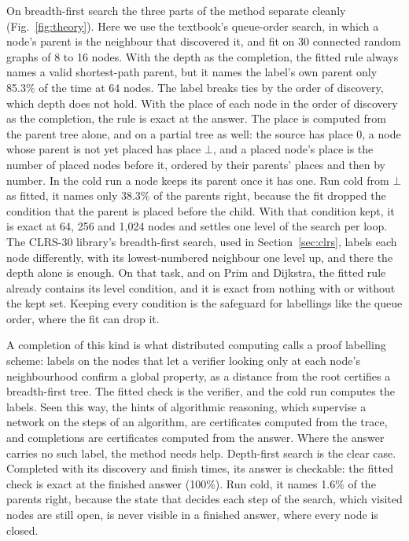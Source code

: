 \documentclass[10pt]{article}
\newcommand{\notyet}{\bot}
\begin{document}
On breadth-first search the three parts of the method separate cleanly (Fig.~\ref{fig:theory}). Here we use the
textbook's queue-order search, in which a node's parent is the neighbour that discovered it, and fit on 30 connected
random graphs of 8 to 16 nodes. With the depth as the completion, the fitted rule always names a valid shortest-path
parent, but it names the label's own parent only 85.3\% of the time at 64 nodes. The label breaks ties by
the order of discovery, which depth does not hold. With the place of each node in the order of discovery as the
completion, the rule is exact at the answer. The place is computed from the parent tree alone, and on a partial tree as
well: the source has place 0, a node whose parent is not yet placed has place $\notyet$, and a placed node's place is the
number of placed nodes before it, ordered by their parents' places and then by number. In the cold run a node keeps its
parent once it has one. Run cold from $\notyet$ as fitted, it
names only 38.3\% of the parents right, because the fit dropped the condition that the parent is placed
before the child. With that condition kept, it is exact at 64, 256 and 1,024 nodes and settles one level of the search
per loop. The CLRS-30 library's breadth-first search, used in Section~\ref{sec:clrs}, labels each node differently, with
its lowest-numbered neighbour one level up, and there the depth alone is enough. On that task, and on Prim and Dijkstra,
the fitted rule already contains its level condition, and it is exact from nothing with or without the kept set. Keeping every condition is the safeguard for labellings
like the queue order, where the fit can drop it.

A completion of this kind is what distributed computing calls a proof labelling scheme: labels on the nodes that let a
verifier looking only at each node's neighbourhood confirm a global property, as a distance from the root certifies a
breadth-first tree\cite{korman2010proof,goos2016locally}. The fitted check is the verifier, and the cold run computes the
labels. Seen this way, the hints of algorithmic reasoning, which supervise a network on the steps of an algorithm, are
certificates computed from the trace, and completions are certificates computed from the answer. Where the answer
carries no such label, the method needs help. Depth-first search is the clear case. Completed with its discovery and
finish times, its answer is checkable: the fitted check is exact at the finished answer (100\%). Run cold,
it names 1.6\% of the parents right, because the state that decides each step of the search, which visited
nodes are still open, is never visible in a finished answer, where every node is closed.
\end{document}
